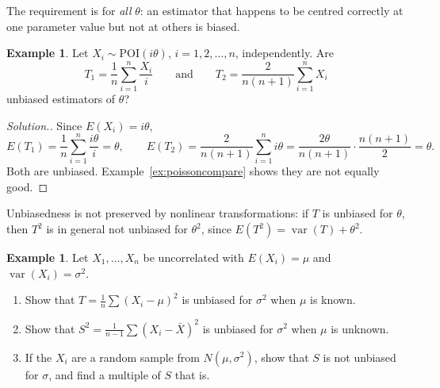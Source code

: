 \documentclass[12pt,a4paper]{report}
\theoremstyle{definition}
\newtheorem{exa}[thm]{Example}
\DeclareMathOperator{\var}{var}
\newenvironment{solution}
  {\renewcommand{\qedsymbol}{}\begin{proof}[\textit{Solution}.]}
  {\end{proof}}
\begin{document}
The requirement is for \emph{all} $\theta$: an estimator that happens to be
centred correctly at one parameter value but not at others is biased.

\begin{exa}
\label{ex:poissonunbiased}
Let $X_i\sim\text{POI}(i\theta)$, $i = 1, 2, \dots, n$, independently. Are
\[T_1 = \frac{1}{n}\sum_{i = 1}^{n}\frac{X_i}{i}\qquad\text{and}\qquad
T_2 = \frac{2}{n(n+1)}\sum^n_{i=1}X_i\]
unbiased estimators of $\theta$?
\end{exa}

\begin{solution}
Since $E(X_i) = i\theta$,
\[E(T_1) = \frac{1}{n}\sum_{i = 1}^n\frac{i\theta}{i} = \theta,\qquad
E(T_2) = \frac{2}{n(n+1)}\sum_{i = 1}^n i\theta = \frac{2\theta}{n(n+1)}\cdot
\frac{n(n+1)}{2} = \theta .\]
Both are unbiased. Example~\ref{ex:poissoncompare} shows they are not equally
good.
\end{solution}

Unbiasedness is not preserved by nonlinear transformations: if $T$ is unbiased
for $\theta$, then $T^2$ is in general not unbiased for $\theta^2$, since
$E(T^2) = \var(T) + \theta^2$.

\begin{exa}
\label{ex:samplevariance}
Let $X_1, \dots, X_n$ be uncorrelated with $E(X_i) = \mu$ and
$\var(X_i) = \sigma^2$.
\begin{enumerate}
\item[(i)] Show that $T = \frac{1}{n}\sum (X_i - \mu)^2$ is unbiased for
$\sigma^2$ when $\mu$ is known.
\item[(ii)] Show that $S^2 = \frac{1}{n - 1}\sum (X_i - \bar X)^2$ is unbiased for
$\sigma^2$ when $\mu$ is unknown.
\item[(iii)] If the $X_i$ are a random sample from $N(\mu, \sigma^2)$, show that
$S$ is not unbiased for $\sigma$, and find a multiple of $S$ that is.
\end{enumerate}
\end{exa}
\end{document}
